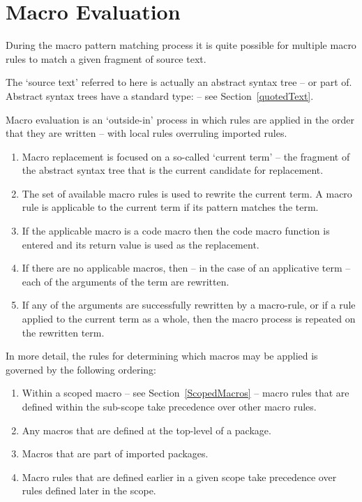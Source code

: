 \section{Macro Evaluation}
\label{macroEvaluation}
During the macro pattern matching process it is quite possible for multiple macro rules to match a given fragment of source text.
\begin{aside}
The `source text' referred to here is actually an abstract syntax tree -- or part of. Abstract syntax trees have a standard type:  -- see Section~\vref{quotedText}.
\end{aside}

Macro evaluation is an `outside-in' process in which rules are applied in the order that they are written -- with local rules overruling imported rules.

\begin{enumerate}
\item Macro replacement is focused on a so-called `current term' -- the fragment of the abstract syntax tree that is the current candidate for replacement.
\item
The set of available macro rules is used to rewrite the current term. A macro rule is applicable to the current term if its pattern matches the term.
\item
If the applicable macro is a code macro then the code macro function is entered and its return value is used as the replacement.
\item
If there are no applicable macros, then -- in the case of an applicative term -- each of the arguments of the term are rewritten.
\item If any of the arguments are successfully rewritten by a macro-rule, or if a rule applied to the current term as a whole, then the macro process is repeated on the rewritten term.
\end{enumerate}

In more detail, the rules for determining which macros may be applied is governed by the following ordering:
\begin{enumerate}
\item
Within a scoped macro -- see Section~\vref{ScopedMacros} -- macro rules that are defined within the sub-scope take precedence over other macro rules.
\item 
Any macros that are defined at the top-level of a package.
\item
Macros that are part of imported packages.
\item
Macro rules that are defined earlier in a given scope take precedence over rules defined later in the scope.
\end{enumerate}

